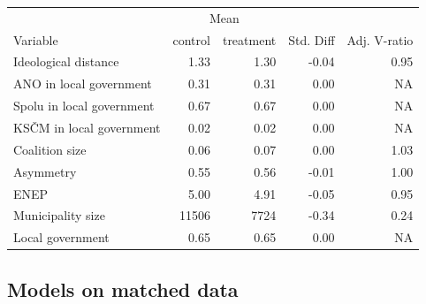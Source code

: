 \documentclass[]{interact}
\theoremstyle{plain}%
\theoremstyle{definition}
\theoremstyle{remark}
\begin{document}
\begin{tabular}{|l|rr|r|r|}
\hline
  & \multicolumn{2}{c|}{Mean} &  &  \\
Variable  & control & treatment & Std. Diff &	Adj. V-ratio\\
\hline
Ideological distance & 1.33 & 1.30 & -0.04 & 0.95 \\
\hline
ANO in local government & 0.31 & 0.31 & 0.00 & NA\\
\hline
Spolu in local government & 0.67 & 0.67 & 0.00 & NA\\
\hline
KSČM in local government & 0.02 & 0.02 & 0.00 & NA\\
\hline
Coalition size & 0.06 & 0.07 & 0.00 & 1.03 \\
\hline
Asymmetry & 0.55 & 0.56 & -0.01 & 1.00 \\
\hline
ENEP & 5.00 & 4.91 & -0.05 & 0.95 \\
\hline
Municipality size & 11506 & 7724 & -0.34 & 0.24 \\
\hline
Local government & 0.65 & 0.65 & 0.00 & NA\\
\hline
\end{tabular}

\subsection{Models on matched data \label{tab:5}}

\end{document}
